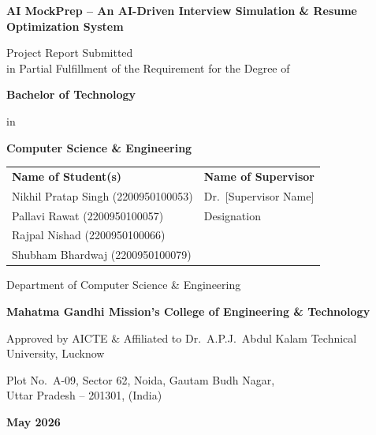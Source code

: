 \documentclass[12pt,a4paper,oneside]{report}
\newcommand{\projecttitle}{AI MockPrep -- An AI-Driven Interview Simulation \& Resume Optimization System}
\newcommand{\dept}{Computer Science \& Engineering}
\newcommand{\college}{Mahatma Gandhi Mission's College of Engineering \& Technology}
\newcommand{\university}{Dr.\ A.P.J.\ Abdul Kalam Technical University, Lucknow}
\newcommand{\submissiondate}{May 2026}
\begin{document}
\setcounter{page}{0}
\pagestyle{frontmatter}

\begin{titlepage}
\begin{center}

\vspace*{0.5cm}
{\large\bfseries \projecttitle}

\vspace{1cm}
{\large Project Report Submitted\\
in Partial Fulfillment of the Requirement for the Degree of}

\vspace{0.5cm}
{\Large\bfseries Bachelor of Technology}

\vspace{0.3cm}
{\large in}

\vspace{0.3cm}
{\Large\bfseries \dept}

\vspace{1.5cm}

\begin{tabular}{ll}
\textbf{Name of Student(s)} & \textbf{Name of Supervisor} \\[6pt]
Nikhil Pratap Singh (2200950100053) & Dr.\ [Supervisor Name] \\
Pallavi Rawat (2200950100057)       & Designation \\
Rajpal Nishad (2200950100066)       & \\
Shubham Bhardwaj (2200950100079)    & \\
\end{tabular}

\vspace{1.5cm}

{\large Department of \dept}

\vspace{0.3cm}
{\large \textbf{\college}}

\vspace{0.3cm}
Approved by AICTE \& Affiliated to \university

\vspace{0.3cm}
Plot No.\ A-09, Sector 62, Noida, Gautam Budh Nagar,\\
Uttar Pradesh -- 201301, (India)

\vspace{0.5cm}
{\large\bfseries \submissiondate}

\end{center}
\end{titlepage}
\end{document}
